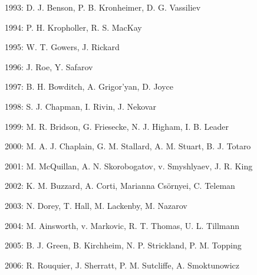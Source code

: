 \documentclass[12pt]{article}
\begin{document}
1993: D. J. Benson, P. B. Kronheimer, D. G. Vassiliev

1994: P. H. Kropholler, R. S. MacKay

1995: W. T. Gowers, J. Rickard

1996: J. Roe, Y. Safarov

1997: B. H. Bowditch, A. Grigor'yan, D. Joyce

1998: S. J. Chapman, I. Rivin, J. Nekovar

1999: M. R. Bridson, G. Friesecke, N. J. Higham, I. B. Leader

2000: M. A. J. Chaplain, G. M. Stallard, A. M. Stuart, B. J. Totaro

2001: M. McQuillan, A. N. Skorobogatov, v. Smyshlyaev, J. R. King

2002: K. M. Buzzard, A. Corti, Marianna Cs\"ornyei, C. Teleman

2003: N. Dorey, T. Hall, M. Lackenby, M. Nazarov

2004: M. Ainsworth, v. Markovic, R. T. Thomas, U. L. Tillmann

2005: B. J. Green, B. Kirchheim, N. P. Strickland, P. M. Topping 

2006: R. Rouquier, J. Sherratt, P. M. Sutcliffe, A. Smoktunowicz
\end{document}
